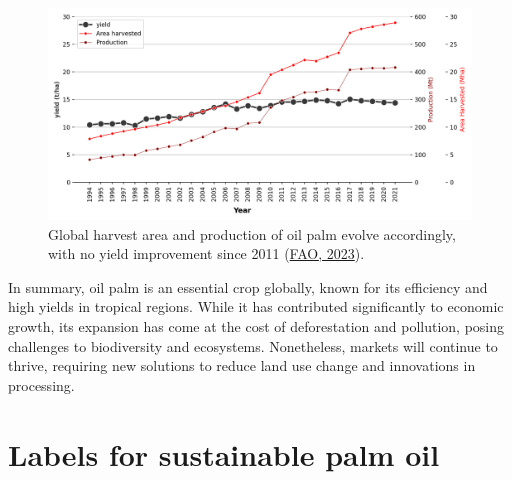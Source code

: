 \documentclass[
  letterpaper,
  DIV=11,
  numbers=noendperiod]{scrreprt}
\begin{document}
\begin{figure}

{\centering \includegraphics{text/04_literature_review_files/op_yield.png}

}

\caption{\label{fig-op_yield}Global harvest area and production of oil
palm evolve accordingly, with no yield improvement since 2011
(\protect\hyperlink{ref-faoFAOSTATDatabase2023}{FAO, 2023}).}

\end{figure}

In summary, oil palm is an essential crop globally, known for its
efficiency and high yields in tropical regions. While it has contributed
significantly to economic growth, its expansion has come at the cost of
deforestation and pollution, posing challenges to biodiversity and
ecosystems. Nonetheless, markets will continue to thrive, requiring new
solutions to reduce land use change and innovations in processing.

\hypertarget{sec-rspo}{%
\section{Labels for sustainable palm oil}\label{sec-rspo}}
\end{document}
